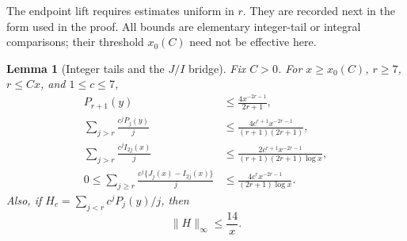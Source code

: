 \documentclass[11pt]{article}
\newtheorem{lemma}[theorem]{Lemma}
\theoremstyle{definition}
\theoremstyle{remark}
\begin{document}
The endpoint lift requires estimates uniform in $r$.  They are recorded
next in the form used in the proof.  All bounds are elementary
integer-tail or integral comparisons; their threshold $x_0(C)$ need not
be effective here.

\begin{lemma}[Integer tails and the $J/I$ bridge]
\label{lem:tails}
Fix $C>0$.  For $x\ge x_0(C)$, $r\ge7$, $r\le Cx$, and
$1\le c\le7$,
\begin{align}
 P_{r+1}(y)&\le\frac{4x^{-2r-1}}{2r+1},
 \label{eq:next-P-upper}\\
 \sum_{j>r}\frac{c^jP_j(y)}j
 &\le\frac{4c^{r+1}x^{-2r-1}}{(r+1)(2r+1)},
 \label{eq:P-integer-tail}\\
 \sum_{j>r}\frac{c^jI_{2j}(x)}j
 &\le\frac{2c^{r+1}x^{-2r-1}}
 {(r+1)(2r+1)\log x},
 \label{eq:I-integer-tail}\\
 0\le\sum_{j\ge r}\frac{c^j\{J_j(x)-I_{2j}(x)\}}j
 &\le\frac{4c^rx^{-2r-1}}{(2r+1)\log x}.
 \label{eq:JI-bridge}
\end{align}
Also, if $H_c=\sum_{j<r}c^jP_j(y)/j$, then
\begin{equation}
 \|H\|_\infty\le\frac{14}{x}.
 \label{eq:head-bound}
\end{equation}
\end{lemma}
\end{document}
